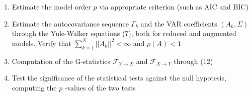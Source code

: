 \documentclass[a4paper]{article}
\begin{document}
\begin{enumerate}
	\item Estimate the model order $p$ via appropriate criterion (such as AIC and BIC)
	
	\item Estimate the autocovariance sequence $\Gamma_k$ and the VAR coefficients $(A_k, \Sigma)$ through the Yule-Walker equations (7), both for reduced and augmented models. Verify that $ \sum_{k=1}^{N}||A_k||^2 < \infty $ and  $\rho(A) < 1$
	
	\item Computation of the G-statistics $ \mathcal{F}_{Y \rightarrow X} $ and $ \mathcal{F}_{X \rightarrow Y} $ through (12)
	
	\item Test the significance of the statistical tests against the null hypotesis, computing the $p$ -values of the two tests 
	
\end{enumerate}
\end{document}
